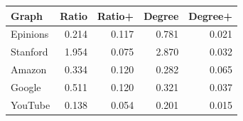 \begin{tabular}{@{}lrrrr@{}}
\toprule
Graph & Ratio & Ratio+ & Degree & Degree+ \\
\midrule
Epinions & 0.214 & 0.117 & 0.781 & 0.021 \\
Stanford & 1.954 & 0.075 & 2.870 & 0.032 \\
Amazon & 0.334 & 0.120 & 0.282 & 0.065 \\
Google & 0.511 & 0.120 & 0.321 & 0.037 \\
YouTube & 0.138 & 0.054 & 0.201 & 0.015 \\
\bottomrule
\end{tabular}
